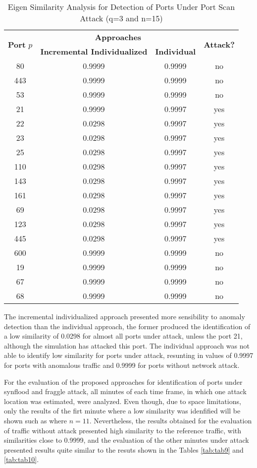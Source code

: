 \documentclass[review]{elsarticle}
\begin{document}
\begin{table}[h!]
  \centering
  \footnotesize
  \caption{Eigen Similarity Analysis for Detection of Ports Under Port Scan Attack (q=3 and n=15)}
  \label{tab:tab8}
  \begin{tabular}{ c c c c }
	\toprule
	\multirow{2}{*}{\textbf{Port} $p$}   &\multicolumn{2}{c}{\textbf{Approaches}} &\multirow{2}{*}{\textbf{Attack?}}\\ 
			\hhline{~--~}
			&\textbf{Incremental Individualized} &\textbf{Individual}\\
	\midrule
	80 &0.9999 &0.9999 &no \\
	443 &0.9999 &0.9999 &no \\
	53 &0.9999 &0.9999 &no \\
	21 &0.9999 &0.9997 &yes \\
	22 &0.0298 &0.9997 &yes \\
	23 &0.0298 &0.9997 &yes \\
	25 &0.0298 &0.9997 &yes \\
	110 &0.0298 &0.9997 &yes \\
	143 &0.0298 &0.9997 &yes \\
	161 &0.0298 &0.9997 &yes \\
	69 &0.0298 &0.9997 &yes \\
	123 &0.0298 &0.9997 &yes \\
	445 &0.0298 &0.9997 &yes \\
	600 &0.9999 &0.9999 &no \\
	19 &0.9999 &0.9999 &no \\
	67 &0.9999 &0.9999 &no \\
	68 &0.9999 &0.9999 &no \\
    \bottomrule
  \end{tabular}
\end{table}

The incremental individualized approach presented more sensibility to anomaly detection than the individual approach, the former produced the identification of a low similarity of 0.0298 for almost all ports under attack, unless the port 21, although the simulation has attacked this port. The individual approach was not able to identify low similarity for ports under attack, resunting in values of 0.9997 for ports with anomalous traffic and 0.9999 for ports without network attack.

For the evaluation of the proposed approaches for identification of ports under synflood and fraggle attack, all minutes of each time frame, in which one attack location was estimated, were analyzed. Even though, due to space limitations, only the results of the firt minute where a low similarity was idenfified will be shown such as where $n=11$. Nevertheless, the results obtained for the evaluation of traffic without attack presented high similarity to the reference traffic, with similarities close to 0.9999, and the evaluation of the other minutes under attack presented results quite similar to the resuts shown in the Tables \ref{tab:tab9} and \ref{tab:tab10}.
\end{document}
